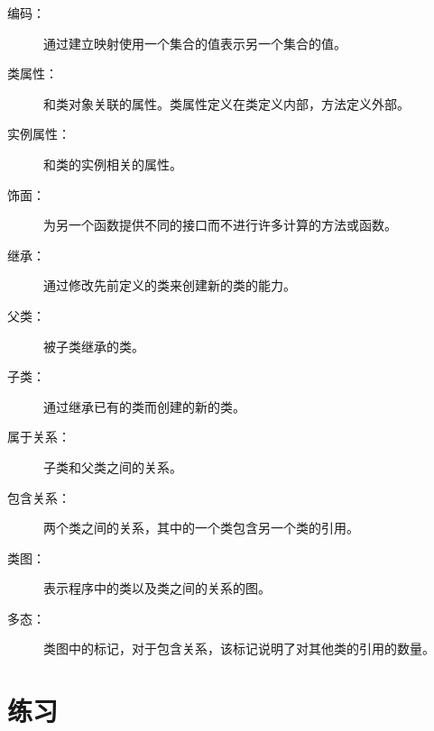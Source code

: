 \begin{description}

\item[编码：] 通过建立映射使用一个集合的值表示另一个集合的值。

\item[类属性：] 和类对象关联的属性。类属性定义在类定义内部，方法定义外部。

\item[实例属性：] 和类的实例相关的属性。

\item[饰面：] 为另一个函数提供不同的接口而不进行许多计算的方法或函数。

\item[继承：] 通过修改先前定义的类来创建新的类的能力。

\item[父类：] 被子类继承的类。

\item[子类：] 通过继承已有的类而创建的新的类。

\item[属于关系：] 子类和父类之间的关系。

\item[包含关系：] 两个类之间的关系，其中的一个类包含另一个类的引用。

\item[类图：] 表示程序中的类以及类之间的关系的图。

\item[多态：] 类图中的标记，对于包含关系，该标记说明了对其他类的引用的数量。

\end{description}


\section{练习}

